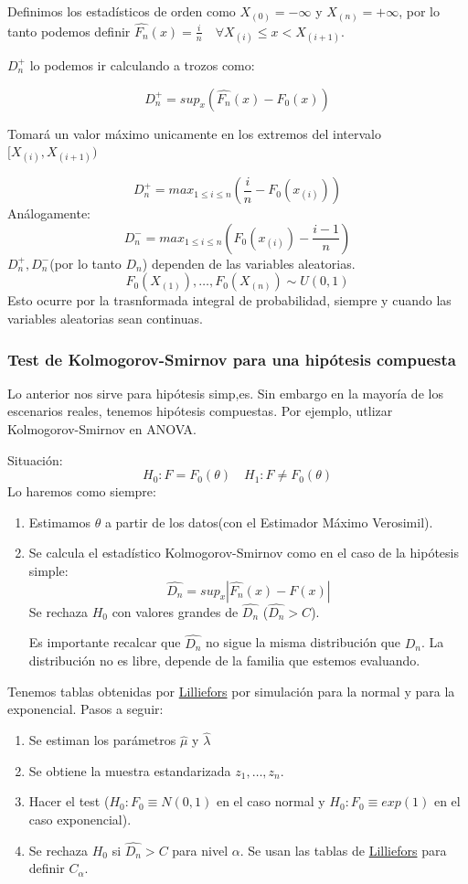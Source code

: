 Definimos los estadísticos de orden como $X_{(0)}=-\infty$ y $X_{(n)}=+\infty$, por lo tanto podemos definir $\widehat{F_n}(x)=\frac{i}{n} \quad \forall X_{(i)} \leq x < X_{(i+1)}$.

$D_n^+$ lo podemos ir calculando a trozos como:

\[
    D_n^+=sup_x(\widehat{F_n}(x)-F_0(x))
\]
    
Tomará un valor máximo unicamente en los extremos del intervalo $[X_{(i)},X_{(i+1)})$        
            
\[
    D_n^+=max_{1 \leq i \leq n}\left(\frac{i}{n}-F_0(x_{(i)})\right)
\]
Análogamente:
\[
    D_n^-=max_{1 \leq i \leq n}\left(F_0(x_{(i)})-\frac{i-1}{n}\right)
\]
$D_n^+,D_n^-$(por lo tanto $D_n$) dependen de las variables aleatorias.
\[
F_0(X_{(1)}),\dots,F_0(X_{(n)}) \sim U(0,1)
\]
Esto ocurre por la trasnformada integral de probabilidad, siempre y cuando las variables aleatorias sean continuas.

\subsubsection{Test de Kolmogorov-Smirnov para una hipótesis compuesta}

Lo anterior nos sirve para hipótesis simp,es. Sin embargo en la mayoría de los escenarios reales, tenemos hipótesis compuestas.
Por ejemplo, utlizar Kolmogorov-Smirnov en ANOVA.

Situación:
\[
H_0: F=F_0(\theta) \quad H_1:F \neq F_0(\theta)
\]
Lo haremos como siempre:
\begin{enumerate}
    \item Estimamos $\theta$ a partir de los datos(con el Estimador Máximo Verosimil).
    \item Se calcula el estadístico Kolmogorov-Smirnov como en el caso de la hipótesis simple:
    \[
    \widehat{D_n}=sup_x|\widehat{F_n}(x)-F(x)|
    \]
    Se rechaza $H_0$ con valores grandes de $\widehat{D_n}$ ($\widehat{D_n}>C$). 
    
    Es importante recalcar que $\widehat{D_n}$ no sigue la misma distribución que $D_n$.
    La distribución no es libre, depende de la familia que estemos evaluando.
\end{enumerate}

Tenemos tablas obtenidas por \href{https://es.wikipedia.org/wiki/Prueba_de_Lilliefors}{Lilliefors}
por simulación para la normal y para la exponencial.
Pasos a seguir:
\begin{enumerate}
    \item Se estiman los parámetros $\hat{\mu}$ y $\widehat{\lambda}$
    \item Se obtiene la muestra estandarizada $z_1,\dots,z_n$.
    \item Hacer el test ($H_0:F_0 \equiv N(0,1)$ en el caso normal y $H_0:F_0\equiv exp(1)$ en el caso exponencial).
    \item Se rechaza $H_0$ si $\widehat{D_n}>C$ para nivel $\alpha$. Se usan las tablas de \href{https://es.wikipedia.org/wiki/Prueba_de_Lilliefors}{Lilliefors}
    para definir $C_\alpha$.
\end{enumerate}

